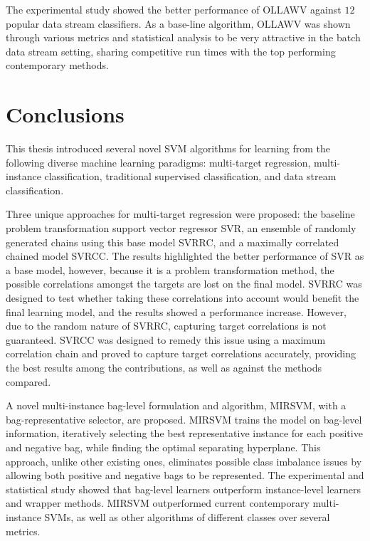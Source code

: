 \documentclass[reqno]{vcuthesis}
\numberwithin{equation}{chapter}
\begin{document}
The experimental study showed the better performance of OLLAWV against $12$ popular data stream classifiers. As a base-line algorithm, OLLAWV was shown through various metrics and statistical analysis to be very attractive in the batch data stream setting, sharing competitive run times with the top performing contemporary methods. 

\chapter{Conclusions}
This thesis introduced several novel SVM algorithms for learning from the following diverse machine learning paradigms: multi-target regression, multi-instance classification, traditional supervised classification, and data stream classification.

Three unique approaches for multi-target regression were proposed: the baseline problem transformation support vector regressor SVR, an ensemble of randomly generated chains using this base model SVRRC, and a maximally correlated chained model SVRCC. The results highlighted the better performance of SVR as a base model, however, because it is a problem transformation method, the possible correlations amongst the targets are lost on the final model. SVRRC was designed to test whether taking these correlations into account would benefit the final learning model, and the results showed a performance increase. However, due to the random nature of SVRRC, capturing target correlations is not guaranteed. SVRCC was designed to remedy this issue using a maximum correlation chain and proved to capture target correlations accurately, providing the best results among the contributions, as well as against the methods compared. 

A novel multi-instance bag-level formulation and algorithm, MIRSVM, with a bag-representative selector, are proposed. MIRSVM trains the model on bag-level information, iteratively selecting the best representative instance for each positive and negative bag, while finding the optimal separating hyperplane. This approach, unlike other existing ones, eliminates possible class imbalance issues by allowing both positive and negative bags to be represented. The experimental and statistical study showed that bag-level learners outperform instance-level learners and wrapper methods. MIRSVM outperformed current contemporary multi-instance SVMs, as well as other algorithms of different classes over several metrics.
\end{document}
